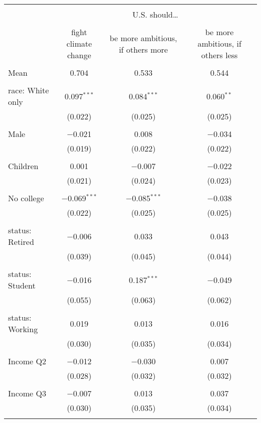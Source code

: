 
\begin{tabular}{@{\extracolsep{5pt}}lccc} 
\\[-1.8ex]\hline 
\hline \\[-1.8ex] 
 & \multicolumn{3}{c}{U.S. should… } \\ 
\cline{2-4} 
\\[-1.8ex] & fight climate change & be more ambitious, if others more & be more ambitious, if others less \\ 
\hline \\[-1.8ex] 
 Mean & 0.704 & 0.533 & 0.544  \\ \hline \\[-1.8ex] race: White only & 0.097$^{***}$ & 0.084$^{***}$ & 0.060$^{**}$ \\ 
  & (0.022) & (0.025) & (0.025) \\ 
  & & & \\ 
 Male & $-$0.021 & 0.008 & $-$0.034 \\ 
  & (0.019) & (0.022) & (0.022) \\ 
  & & & \\ 
 Children & 0.001 & $-$0.007 & $-$0.022 \\ 
  & (0.021) & (0.024) & (0.023) \\ 
  & & & \\ 
 No college & $-$0.069$^{***}$ & $-$0.085$^{***}$ & $-$0.038 \\ 
  & (0.022) & (0.025) & (0.025) \\ 
  & & & \\ 
 status: Retired & $-$0.006 & 0.033 & 0.043 \\ 
  & (0.039) & (0.045) & (0.044) \\ 
  & & & \\ 
 status: Student & $-$0.016 & 0.187$^{***}$ & $-$0.049 \\ 
  & (0.055) & (0.063) & (0.062) \\ 
  & & & \\ 
 status: Working & 0.019 & 0.013 & 0.016 \\ 
  & (0.030) & (0.035) & (0.034) \\ 
  & & & \\ 
 Income Q2 & $-$0.012 & $-$0.030 & 0.007 \\ 
  & (0.028) & (0.032) & (0.032) \\ 
  & & & \\ 
 Income Q3 & $-$0.007 & 0.013 & 0.037 \\ 
  & (0.030) & (0.035) & (0.034) \\ 
  & & & \\ 

\end{tabular}
